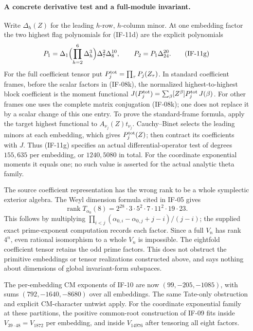 \paragraph{A concrete derivative test and a full-module invariant.}
Write $\Delta_h(Z)$ for the leading $h$-row, $h$-column minor.
At one embedding factor the two highest flag polynomials for (IF-11d)
are the explicit polynomials
\[
 P_1=\Delta_1\Bigl(\prod_{h=2}^6\Delta_h^3\Bigr)
            \Delta_7^2\Delta_8^{10},\qquad
 P_2=P_1\Delta_{24}^{20}.                         \tag{IF-11g}
\]
For the full coefficient tensor put
$P_j^{\rm tot}=\prod_\tau P_j(Z_\tau)$. In standard coefficient
frames, before the scalar factors in (IF-08k), the normalized
highest-to-highest block coefficient is the moment functional
$J(P_j^{\rm tot})=\sum_\beta[Z^\beta]P_j^{\rm tot}\,J(\beta)$.
For other frames one uses the complete matrix conjugation (IF-08k);
one does not replace it by a scalar change of this one entry.
To prove the standard-frame formula,
apply the target highest functional to $A_{\nu_j}(Z)t_{\nu_j}$.
Cauchy--Binet selects the leading minors at each embedding, which gives
$P_j^{\rm tot}(Z)$; then contract its coefficients with $J$. Thus
(IF-11g) specifies an actual differential-operator test of degrees
$155,635$ per embedding, or $1240,5080$ in total. For the
coordinate exponential moments it equals one; no such value is
asserted for the actual analytic theta family.

The source coefficient representation has the wrong rank to be a
whole symplectic exterior algebra. The Weyl dimension
formula cited in IF-05 gives
\[
 \operatorname{rank}T_{\alpha_0}(8)
  =2^{28}\cdot3\cdot5^2\cdot7\cdot11^2\cdot19\cdot23.
                                                               \tag{IF-11h}
\]
This follows by multiplying
$\prod_{i<j}(\alpha_{0,i}-\alpha_{0,j}+j-i)/(j-i)$; the supplied
exact prime-exponent computation records each factor. Since a full
$V_n$ has rank $4^n$, even rational isomorphism to a whole $V_n$ is
impossible. The eightfold coefficient tensor retains the odd prime
factors. This does not obstruct the primitive embeddings or tensor
realizations constructed above, and says nothing about dimensions
of global invariant-form subspaces.

The per-embedding CM exponents of IF-10 are now
$(99,-205,-1085)$, with sums $(792,-1640,-8680)$ over all embeddings.
The same Tate-only obstruction and explicit CM-character untwist apply.
For the coordinate exponential family at these partitions, the positive
common-root construction of IF-09 fits inside $V_{39\cdot48}=V_{1872}$
per embedding, and inside $V_{14976}$ after tensoring all eight factors.

